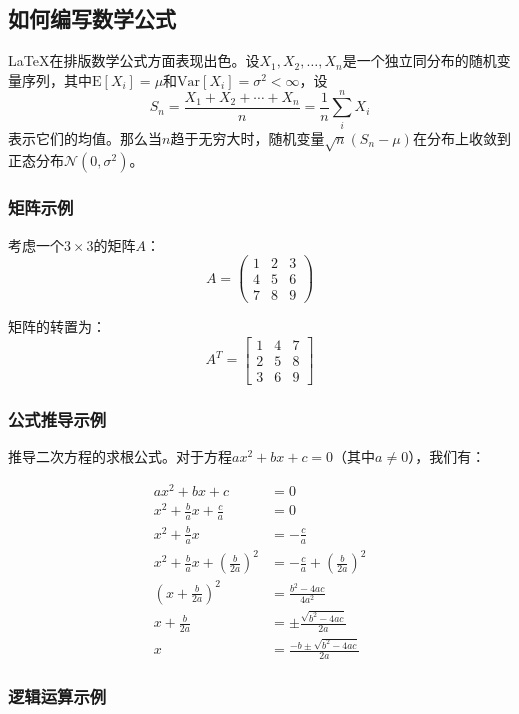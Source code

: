 \documentclass{article}
\begin{document}
\subsection{如何编写数学公式}

\LaTeX{}在排版数学公式方面表现出色。设$X_1, X_2, \ldots, X_n$是一个独立同分布的随机变量序列，其中$\text{E}[X_i] = \mu$和$\text{Var}[X_i] = \sigma^2 < \infty$，设
\[S_n = \frac{X_1 + X_2 + \cdots + X_n}{n}
      = \frac{1}{n}\sum_{i}^{n} X_i\]
表示它们的均值。那么当$n$趋于无穷大时，随机变量$\sqrt{n}(S_n - \mu)$在分布上收敛到正态分布$\mathcal{N}(0, \sigma^2)$。

\subsubsection{矩阵示例}

考虑一个$3 \times 3$的矩阵$A$：
\[A = \begin{pmatrix}
1 & 2 & 3 \\
4 & 5 & 6 \\
7 & 8 & 9
\end{pmatrix}\]

矩阵的转置为：
\[A^T = \begin{bmatrix}
1 & 4 & 7 \\
2 & 5 & 8 \\
3 & 6 & 9
\end{bmatrix}\]

\subsubsection{公式推导示例}

推导二次方程的求根公式。对于方程$ax^2 + bx + c = 0$（其中$a \neq 0$），我们有：

\begin{align}
ax^2 + bx + c &= 0 \\
x^2 + \frac{b}{a}x + \frac{c}{a} &= 0 \\
x^2 + \frac{b}{a}x &= -\frac{c}{a} \\
x^2 + \frac{b}{a}x + \left(\frac{b}{2a}\right)^2 &= -\frac{c}{a} + \left(\frac{b}{2a}\right)^2 \\
\left(x + \frac{b}{2a}\right)^2 &= \frac{b^2 - 4ac}{4a^2} \\
x + \frac{b}{2a} &= \pm\frac{\sqrt{b^2 - 4ac}}{2a} \\
x &= \frac{-b \pm \sqrt{b^2 - 4ac}}{2a}
\end{align}

\subsubsection{逻辑运算示例}
\end{document}
